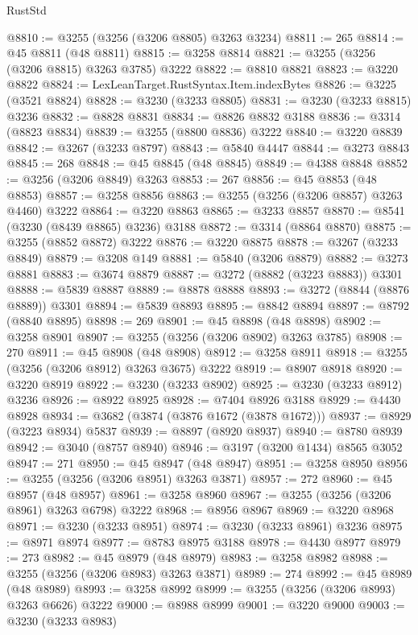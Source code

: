 \begin{lexlean}{RustStd}
\begin{coremodule}
{\begin{coremodule}
{{{{{{{{{{{{{{{{{{{{{{{{{{{{{{{{{{{{{@8810 := @3255 (@3256 (@3206 @8805) @3263 @3234)
@8811 := 265
@8814 := @45 @8811 (@48 @8811)
@8815 := @3258 @8814
@8821 := @3255 (@3256 (@3206 @8815) @3263 @3785) @3222
@8822 := @8810 @8821
@8823 := @3220 @8822
@8824 := LexLeanTarget.RustSyntax.Item.indexBytes
@8826 := @3225 (@3521 @8824)
@8828 := @3230 (@3233 @8805)
@8831 := @3230 (@3233 @8815) @3236
@8832 := @8828 @8831
@8834 := @8826 @8832 @3188
@8836 := @3314 (@8823 @8834)
@8839 := @3255 (@8800 @8836) @3222
@8840 := @3220 @8839
@8842 := @3267 (@3233 @8797)
@8843 := @5840 @4447
@8844 := @3273 @8843
@8845 := 268
@8848 := @45 @8845 (@48 @8845)
@8849 := @4388 @8848
@8852 := @3256 (@3206 @8849) @3263
@8853 := 267
@8856 := @45 @8853 (@48 @8853)
@8857 := @3258 @8856
@8863 := @3255 (@3256 (@3206 @8857) @3263 @4460) @3222
@8864 := @3220 @8863
@8865 := @3233 @8857
@8870 := @8541 (@3230 (@8439 @8865) @3236) @3188
@8872 := @3314 (@8864 @8870)
@8875 := @3255 (@8852 @8872) @3222
@8876 := @3220 @8875
@8878 := @3267 (@3233 @8849)
@8879 := @3208 @149
@8881 := @5840 (@3206 @8879)
@8882 := @3273 @8881
@8883 := @3674 @8879
@8887 := @3272 (@8882 (@3223 @8883)) @3301
@8888 := @5839 @8887
@8889 := @8878 @8888
@8893 := @3272 (@8844 (@8876 @8889)) @3301
@8894 := @5839 @8893
@8895 := @8842 @8894
@8897 := @8792 (@8840 @8895)
@8898 := 269
@8901 := @45 @8898 (@48 @8898)
@8902 := @3258 @8901
@8907 := @3255 (@3256 (@3206 @8902) @3263 @3785)
@8908 := 270
@8911 := @45 @8908 (@48 @8908)
@8912 := @3258 @8911
@8918 := @3255 (@3256 (@3206 @8912) @3263 @3675) @3222
@8919 := @8907 @8918
@8920 := @3220 @8919
@8922 := @3230 (@3233 @8902)
@8925 := @3230 (@3233 @8912) @3236
@8926 := @8922 @8925
@8928 := @7404 @8926 @3188
@8929 := @4430 @8928
@8934 := @3682 (@3874 (@3876 @1672 (@3878 @1672)))
@8937 := @8929 (@3223 @8934) @5837
@8939 := @8897 (@8920 @8937)
@8940 := @8780 @8939
@8942 := @3040 (@8757 @8940)
@8946 := @3197 (@3200 @1434) @8565 @3052
@8947 := 271
@8950 := @45 @8947 (@48 @8947)
@8951 := @3258 @8950
@8956 := @3255 (@3256 (@3206 @8951) @3263 @3871)
@8957 := 272
@8960 := @45 @8957 (@48 @8957)
@8961 := @3258 @8960
@8967 := @3255 (@3256 (@3206 @8961) @3263 @6798) @3222
@8968 := @8956 @8967
@8969 := @3220 @8968
@8971 := @3230 (@3233 @8951)
@8974 := @3230 (@3233 @8961) @3236
@8975 := @8971 @8974
@8977 := @8783 @8975 @3188
@8978 := @4430 @8977
@8979 := 273
@8982 := @45 @8979 (@48 @8979)
@8983 := @3258 @8982
@8988 := @3255 (@3256 (@3206 @8983) @3263 @3871)
@8989 := 274
@8992 := @45 @8989 (@48 @8989)
@8993 := @3258 @8992
@8999 := @3255 (@3256 (@3206 @8993) @3263 @6626) @3222
@9000 := @8988 @8999
@9001 := @3220 @9000
@9003 := @3230 (@3233 @8983)
}}}}}}}}}}}}}}}}}}}}}}}}}}}}}}}}}}}}}
\end{coremodule}}
\end{coremodule}
\end{lexlean}
